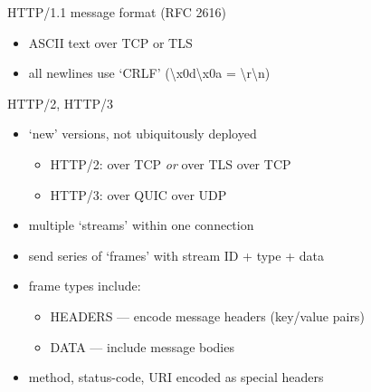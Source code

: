 \begin{frame}{HTTP/1.1 message format (RFC 2616)}
\begin{itemize}
\item ASCII text over TCP or TLS 
\item all newlines use `CRLF' (\textbackslash x0d\textbackslash x0a = \textbackslash r\textbackslash n)
\end{itemize}
\providecommand{\crlf}{\textit{\color{black!50}CRLF}}
\end{frame}

\begin{frame}{HTTP/2, HTTP/3}
    \begin{itemize}
    \item `new' versions, not ubiquitously deployed
        \begin{itemize}
        \item HTTP/2: over TCP \textit{or} over TLS over TCP
        \item HTTP/3: over QUIC over UDP
        \end{itemize}
    \vspace{.5cm}
    \item multiple `streams' within one connection 
    \item send series of `frames' with stream ID + type + data
    \item frame types include:
        \begin{itemize}
        \item HEADERS --- encode message headers (key/value pairs)
        \item DATA --- include message bodies
        \end{itemize}
    \item method, status-code, URI encoded as special headers
    \end{itemize}
\end{frame}


